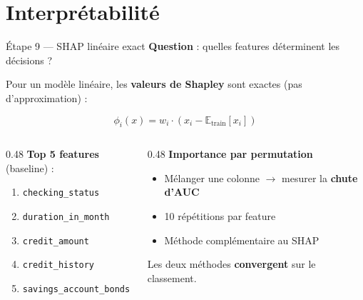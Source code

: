 \documentclass[aspectratio=169, 11pt]{beamer}
\begin{document}
\section{Interpr\'etabilit\'e}

\begin{frame}{\'Etape 9 --- SHAP lin\'eaire exact}
\textbf{Question} : quelles features d\'eterminent les d\'ecisions ?

\vspace{0.3em}
Pour un mod\`ele lin\'eaire, les \textbf{valeurs de Shapley} sont exactes (pas d'approximation) :

$$\phi_i(x) = w_i \cdot \left(x_i - \mathbb{E}_{\text{train}}[x_i]\right)$$

\begin{columns}[T]
\begin{column}{0.48\textwidth}
\textbf{Top 5 features} (baseline) :
\begin{enumerate}
    \item \texttt{checking\_status}
    \item \texttt{duration\_in\_month}
    \item \texttt{credit\_amount}
    \item \texttt{credit\_history}
    \item \texttt{savings\_account\_bonds}
\end{enumerate}
\end{column}
\begin{column}{0.48\textwidth}
\textbf{Importance par permutation}
\begin{itemize}
    \item M\'elanger une colonne $\to$ mesurer la \textbf{chute d'AUC}
    \item 10 r\'ep\'etitions par feature
    \item M\'ethode compl\'ementaire au SHAP
\end{itemize}

\vspace{0.3em}
\begin{exampleblock}{}
\small Les deux m\'ethodes \textbf{convergent} sur le classement.
\end{exampleblock}
\end{column}
\end{columns}
\end{frame}
\end{document}
